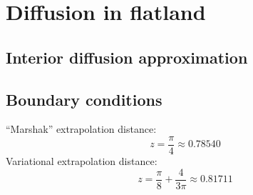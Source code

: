 \section{Diffusion in flatland}

\subsection{Interior diffusion approximation}

\subsection{Boundary conditions}

``Marshak'' extrapolation distance:
\begin{equation*}
  z = \frac{\pi}{4} \approx 0.78540
\end{equation*}
Variational extrapolation distance:
\begin{equation*}
  z = \frac{\pi}{8} + \frac{4}{3\pi} \approx 0.81711
\end{equation*}


